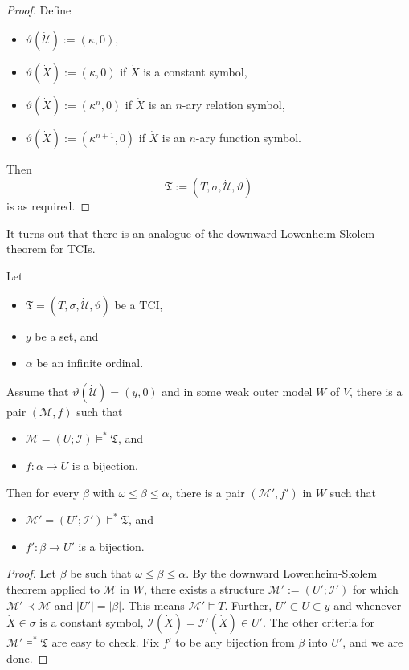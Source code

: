 \documentclass[12pt]{article}
\numberwithin{equation}{section}
\begin{document}
\begin{proof}
Define 
\begin{itemize}
    \item $\vartheta (\dot{\mathcal{U}}) := (\kappa, 0)$,
    \item $\vartheta (\dot{X}) := (\kappa, 0)$ if $\dot{X}$ is a constant symbol,
    \item $\vartheta (\dot{X}) := (\kappa^n, 0)$ if $\dot{X}$ is an $n$-ary relation symbol,
    \item $\vartheta (\dot{X}) := (\kappa^{n + 1}, 0)$ if $\dot{X}$ is an $n$-ary function symbol.
\end{itemize}
Then $$\mathfrak{T} := (T, \sigma, \dot{\mathcal{U}}, \vartheta)$$ is as required.
\end{proof}

It turns out that there is an analogue of the downward Lowenheim-Skolem theorem for TCIs.

\begin{lem}\label{DLS}
Let 
\begin{itemize}
    \item $\mathfrak{T} = (T, \sigma, \dot{\mathcal{U}}, \vartheta)$ be a TCI,
    \item $y$ be a set, and
    \item $\alpha$ be an infinite ordinal. 
\end{itemize}
Assume that $\vartheta(\dot{\mathcal{U}}) = (y, 0)$ and in some weak outer model $W$ of $V$, there is a pair $(\mathcal{M}, f)$ such that
\begin{itemize}
    \item $\mathcal{M} = (U; \mathcal{I}) \models^* \mathfrak{T}$, and
    \item $f : \alpha \longrightarrow U$ is a bijection.
\end{itemize}
Then for every $\beta$ with $\omega \leq \beta \leq \alpha$, there is a pair $(\mathcal{M}', f')$ in $W$ such that 
\begin{itemize}
    \item $\mathcal{M}' = (U'; \mathcal{I}') \models^* \mathfrak{T}$, and
    \item $f' : \beta \longrightarrow U'$ is a bijection.
\end{itemize}
\end{lem}

\begin{proof}
Let $\beta$ be such that $\omega \leq \beta \leq \alpha$. By the downward Lowenheim-Skolem theorem applied to $\mathcal{M}$ in $W$, there exists a structure $\mathcal{M}' := (U'; \mathcal{I}')$ for which $\mathcal{M}' \prec \mathcal{M}$ and $|U'| = |\beta|$. This means $\mathcal{M'} \models T$. Further, $U' \subset U \subset y$ and whenever $\dot{X} \in \sigma$ is a constant symbol, $\mathcal{I}(\dot{X}) = \mathcal{I}'(\dot{X}) \in U'$. The other criteria for $\mathcal{M}' \models^* \mathfrak{T}$ are easy to check. Fix $f'$ to be any bijection from $\beta$ into $U'$, and we are done.
\end{proof}
\end{document}
